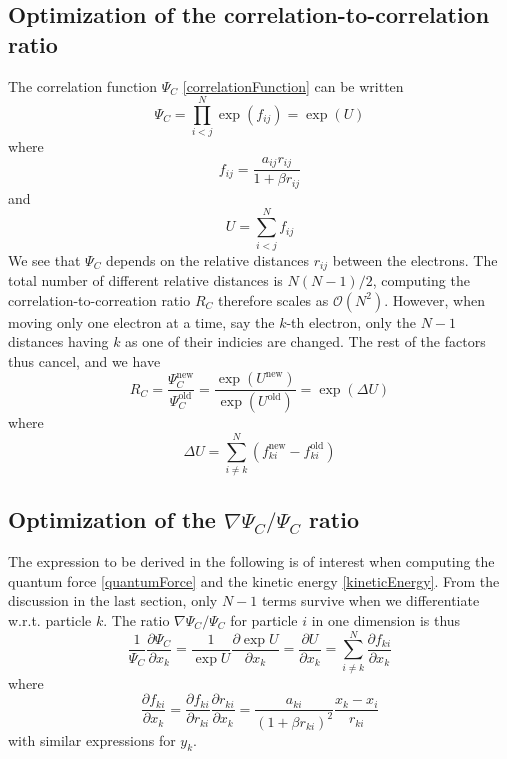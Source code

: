 \documentclass[english, a4paper]{article}
\begin{document}
\subsection{Optimization of the correlation-to-correlation ratio}
The correlation function $\Psi_C$ \eqref{correlationFunction} can be written
\begin{equation}
 \Psi_C = \prod_{i<j}^N\exp{(f_{ij})} = \exp(U)
\end{equation}
where 
\begin{equation}
 f_{ij} = \frac{a_{ij}r_{ij}}{1+\beta r_{ij}}
 \label{pade-jastrow}
\end{equation}
and 
\begin{equation}
 U = \sum_{i<j}^Nf_{ij}
\end{equation}
We see that $\Psi_C$ depends on the relative distances $r_{ij}$ between the electrons. The total
number of different relative distances is $N(N-1)/2$, computing the correlation-to-correation ratio
$R_C$ therefore scales as $\mathcal{O}(N^2)$. However, when moving only one electron at a time, say the 
$k$-th electron, only the $N-1$ distances having $k$ as one of their indicies are changed. The 
rest of the factors thus cancel, and we have
\begin{equation}
 R_C = \frac{\Psi_C^{\textrm{new}}}{\Psi_C^{\textrm{old}}} = 
 \frac{\exp{(U^{\textrm{new}})}}{\exp{(U^{\textrm{old}})}} = 
 \exp{(\Delta U)}
\end{equation}
where 
\begin{equation}
 \Delta U = \sum_{i\neq k}^N (f_{ki}^{\textrm{new}} - f_{ki}^{\textrm{old}})
\end{equation}

\subsection{Optimization of the $\nabla \Psi_C / \Psi_C$ ratio}
The expression to be derived in the following is of interest when computing the quantum force \eqref{quantumForce}
and the kinetic energy \eqref{kineticEnergy}. From the discussion in the last section, only $N-1$ terms survive
when we differentiate w.r.t. particle $k$. 
The ratio $\nabla \Psi_C / \Psi_C$ for particle $i$
in one dimension is thus
\begin{equation}
\frac{1}{\Psi_C}\frac{\partial \Psi_C}{\partial x_k} = 
\frac{1}{\exp{U}}\frac{\partial \exp{U}}{\partial x_k} = 
\frac{\partial U}{\partial x_k} = 
\sum_{i\neq k}^N \frac{\partial f_{ki}}{\partial x_k}
\end{equation}
where
\begin{equation}
 \frac{\partial f_{ki}}{\partial x_k} = \frac{\partial f_{ki}}{\partial r_{ki}}
 \frac{\partial r_{ki}}{\partial x_k} = \frac{a_{ki}}{(1 + \beta r_{ki})^2}\frac{x_k - x_i}{r_{ki}}
\end{equation}
with similar expressions for $y_k$. 
\end{document}
